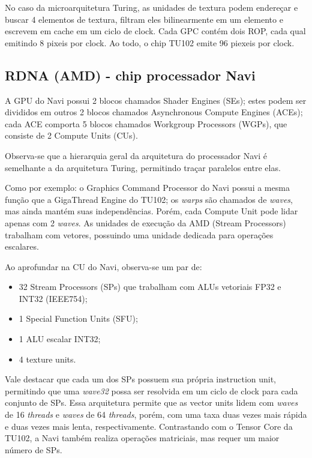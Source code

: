 \documentclass[letterpaper, 10 pt, conference]{ieeeconf}  %
\begin{document}
No caso da microarquitetura Turing, as unidades de textura podem endereçar e buscar 4 elementos de textura, filtram eles bilinearmente em um elemento e escrevem em cache em um ciclo de clock. Cada GPC contém dois ROP, cada qual emitindo 8 pixeis por clock. Ao todo, o chip TU102 emite 96 piexeis por clock.




\subsection{RDNA (AMD) - chip processador Navi}

A GPU do Navi possui 2 blocos chamados Shader Engines (SEs); estes podem ser divididos em outros 2 blocos chamados Asynchronous Compute Engines (ACEs); cada ACE comporta 5 blocos chamados Workgroup Processors (WGPs), que consiste de 2 Compute Units (CUs).

Observa-se que a hierarquia geral da arquitetura do processador Navi é semelhante a da arquitetura Turing, permitindo traçar paralelos entre elas.

Como por exemplo: o Graphics Command Processor do Navi possui a mesma função que a GigaThread Engine do TU102; os \textit{warps} são chamados de \textit{waves}, mas ainda mantém suas independências. Porém, cada Compute Unit pode lidar apenas com 2 \textit{waves}. As unidades de execução da AMD (Stream Processors) trabalham com vetores, possuindo uma unidade dedicada para operações escalares.

Ao aprofundar na CU do Navi, observa-se um par de:

\begin{itemize}
    \item 32 Stream Processors (SPs) que trabalham com ALUs vetoriais FP32 e INT32 (IEEE754);
    \item 1 Special Function Units (SFU);
    \item 1 ALU escalar INT32;
    \item 4 texture units.
\end{itemize}

Vale destacar que cada um dos SPs possuem sua própria instruction unit, permitindo que uma \textit{wave32} possa ser resolvida em um ciclo de clock para cada conjunto de SPs. Essa arquitetura permite que as vector units lidem com \textit{waves} de 16 \textit{threads} e \textit{waves} de 64 \textit{threads}, porém, com uma taxa duas vezes mais rápida e duas vezes mais lenta, respectivamente. Contrastando com o Tensor Core da TU102, a Navi também realiza operações matriciais, mas requer um maior número de SPs.
\end{document}
